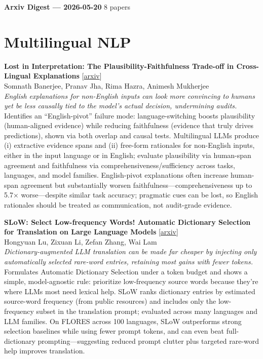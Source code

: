\documentclass[12pt,letterpaper]{article}
\begin{document}
{\footnotesize\textbf{Arxiv Digest --- 2026-05-20} \hfill 8 papers}

\smallskip

\section*{Multilingual NLP}

{\small\textbf{Lost in Interpretation: The Plausibility-Faithfulness Trade-off in Cross-Lingual Explanations}} {\scriptsize[\href{https://arxiv.org/abs/2605.19274}{arxiv}]}\\
{\scriptsize Somnath Banerjee, Pranav Jha, Rima Hazra, Animesh Mukherjee}\\

{\small\textit{English explanations for non-English inputs can look more convincing to humans yet be less causally tied to the model's actual decision, undermining audits.}}\\[1pt]
{\footnotesize Identifies an ``English-pivot'' failure mode: language-switching boosts plausibility (human-aligned evidence) while reducing faithfulness (evidence that truly drives predictions), shown via both overlap and causal tests. Multilingual LLMs produce (i) extractive evidence spans and (ii) free-form rationales for non-English inputs, either in the input language or in English; evaluate plausibility via human-span agreement and faithfulness via comprehensiveness/sufficiency across tasks, languages, and model families. English-pivot explanations often increase human-span agreement but substantially worsen faithfulness---comprehensiveness up to 5.7× worse---despite similar task accuracy; pragmatic cues can be lost, so English rationales should be treated as communication, not audit-grade evidence.}

\medskip

{\small\textbf{SLoW: Select Low-frequency Words! Automatic Dictionary Selection for Translation on Large Language Models}} {\scriptsize[\href{https://arxiv.org/abs/2507.18902}{arxiv}]}\\
{\scriptsize Hongyuan Lu, Zixuan Li, Zefan Zhang, Wai Lam}\\

{\small\textit{Dictionary-augmented LLM translation can be made far cheaper by injecting only automatically selected rare-word entries, retaining most gains with fewer tokens.}}\\[1pt]
{\footnotesize Formulates Automatic Dictionary Selection under a token budget and shows a simple, model-agnostic rule: prioritize low-frequency source words because they're where LLMs most need lexical help. SLoW ranks dictionary entries by estimated source-word frequency (from public resources) and includes only the low-frequency subset in the translation prompt; evaluated across many languages and LLM families. On FLORES across 100 languages, SLoW outperforms strong selection baselines while using fewer prompt tokens, and can even beat full-dictionary prompting---suggesting reduced prompt clutter plus targeted rare-word help improves translation.}
\end{document}
